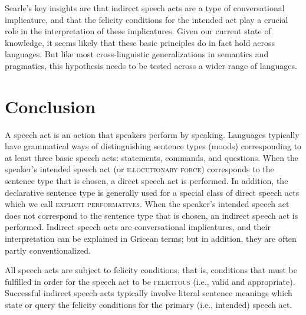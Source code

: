 Searle’s key insights are that indirect speech acts are a type of conversational implicature, and that the felicity conditions for the intended act play a crucial role in the interpretation of these implicatures. Given our current state of knowledge, it seems likely that these basic principles do in fact hold across languages. But like most cross-linguistic generalizations in semantics and pragmatics, this hypothesis needs to be tested across a wider range of languages.


\section{Conclusion}\label{sec:10.5}

A speech act is an action that speakers perform by speaking. Languages typically have grammatical ways of distinguishing sentence types (moods) corresponding to at least three basic speech acts: statements, commands, and questions. When the speaker’s intended speech act (or \textsc{illocutionary force}) corresponds to the sentence type that is chosen, a direct speech act is performed. In addition, the declarative sentence type is generally used for a special class of direct speech acts which we call \textsc{explicit performatives}. When the speaker’s intended speech act does not correspond to the sentence type that is chosen, an indirect speech act is performed. Indirect speech acts are conversational implicatures, and their interpretation can be explained in Gricean terms; but in addition, they are often partly conventionalized.



All speech acts are subject to felicity conditions, that is, conditions that must be fulfilled in order for the speech act to be \textsc{felicitous} (i.e., valid and appropriate). Successful indirect speech acts typically involve literal sentence meanings which state or query the felicity conditions for the primary (i.e., intended) speech act.



